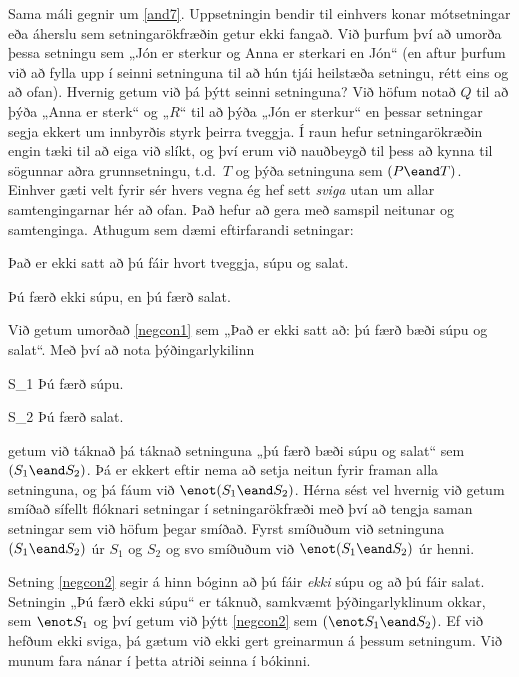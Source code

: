 Sama máli gegnir um \ref{and7}. Uppsetningin bendir til einhvers konar mótsetningar eða áherslu sem setningarökfræðin getur ekki fangað. Við þurfum því að umorða þessa setningu sem „Jón er sterkur og Anna er sterkari en Jón“ (en aftur þurfum við að fylla upp í seinni setninguna til að hún tjái heilstæða setningu, rétt eins og að ofan). Hvernig getum við þá þýtt seinni setninguna? Við höfum notað $Q$ til að þýða „Anna er sterk“ og „$R$“ til að þýða „Jón er sterkur“ en þessar setningar segja ekkert um innbyrðis styrk þeirra tveggja. Í raun hefur setningarökræðin engin tæki til að eiga við slíkt, og því erum við nauðbeygð til þess að kynna til sögunnar aðra grunnsetningu, t.d.\ $T$ og þýða setninguna sem $(P \eand T)$.
Einhver gæti velt fyrir sér hvers vegna ég hef sett \emph{sviga} utan um allar samtengingarnar hér að ofan. Það hefur að gera með samspil neitunar og samtenginga. Athugum sem dæmi eftirfarandi setningar:	
	\begin{earg}
		\item[\ex{negcon1}] Það er ekki satt að þú fáir hvort tveggja, súpu og salat.
		\item[\ex{negcon2}] Þú færð ekki súpu, en þú færð salat.
	\end{earg}
Við getum umorðað \ref{negcon1} sem „Það er ekki satt að: þú færð bæði súpu og salat“. Með því að nota þýðingarlykilinn	
	\begin{ekey}
		\item[S_1] Þú færð súpu.
		\item[S_2] Þú færð salat.
	\end{ekey}
getum við táknað þá táknað setninguna „þú færð bæði súpu og salat“ sem $(S_1 \eand S_2)$. Þá er ekkert eftir nema að setja neitun fyrir framan alla setninguna, og þá fáum við $\enot(S_1 \eand S_2)$. Hérna sést vel hvernig við getum smíðað sífellt flóknari setningar í setningarökfræði með því að tengja saman setningar sem við höfum þegar smíðað. Fyrst smíðuðum við setninguna $(S_1 \eand S_2)$ úr $S_1$ og $S_2$ og svo smíðuðum við $\enot(S_1 \eand S_2)$ úr henni.

Setning \ref{negcon2} segir á hinn bóginn að þú fáir \emph{ekki} súpu og að þú fáir salat. Setningin „Þú færð ekki súpu“ er táknuð, samkvæmt þýðingarlyklinum okkar, sem $\enot S_1$ og því getum við þýtt \ref{negcon2} sem $(\enot S_1 \eand S_2)$. Ef við hefðum ekki sviga, þá gætum við ekki gert greinarmun á þessum setningum. Við munum fara nánar í þetta atriði seinna í bókinni.

